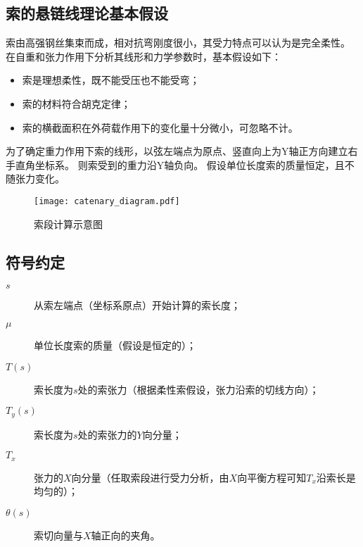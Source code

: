 \subsection{索的悬链线理论基本假设}
索由高强钢丝集束而成，相对抗弯刚度很小，其受力特点可以认为是完全柔性。
在自重和张力作用下分析其线形和力学参数时，基本假设如下：

\begin{itemize}
  \item
  索是理想柔性，既不能受压也不能受弯；
  \item
  索的材料符合胡克定律；
  \item
  索的横截面积在外荷载作用下的变化量十分微小，可忽略不计。
\end{itemize}

为了确定重力作用下索的线形，以弦左端点为原点、竖直向上为Y轴正方向建立右手直角坐标系。
则索受到的重力沿Y轴负向。
假设单位长度索的质量恒定，且不随张力变化。

\begin{figure}[!htbp]
  \centering
  \texttt{[image: catenary\_diagram.pdf]}
  \label{fig:catenary}
  \caption{索段计算示意图}
\end{figure}

\subsection{符号约定}
\begin{description}
  \item[$s$]
  从索左端点（坐标系原点）开始计算的索长度；
  \item[$\mu$]
  单位长度索的质量（假设是恒定的）；
  \item[$T(s)$]
  索长度为$s$处的索张力（根据柔性索假设，张力沿索的切线方向）；
  \item[$T_y(s)$]
  索长度为$s$处的索张力的$Y$向分量；
  \item[$T_x$]
  张力的$X$向分量（任取索段进行受力分析，由$X$向平衡方程可知$T_x$沿索长是均匀的）；
  \item[$\theta(s)$]
  索切向量与$X$轴正向的夹角。
\end{description}

